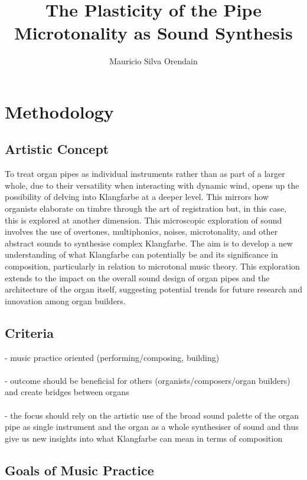 \documentclass[11pt, oneside]{report}   	%
\title{%
 The Plasticity of the Pipe \\
  \large Microtonality as Sound Synthesis \\
    }
\author{Mauricio Silva Orendain}
\begin{document}
\maketitle

\chapter*{Methodology}

\section{Artistic Concept}

To treat organ pipes as individual instruments rather than as part of a larger whole, due to their versatility when interacting with dynamic wind, opens up the possibility of delving into Klangfarbe at a deeper level. This mirrors how organists elaborate on timbre through the art of registration but, in this case, this is explored at another dimension. This microscopic exploration of sound involves the use of overtones, multiphonics, noises, microtonality, and other abstract sounds to synthesise complex Klangfarbe. The aim is to develop a new understanding of what Klangfarbe can potentially be and its significance in composition, particularly in relation to microtonal music theory. This exploration extends to the impact on the overall sound design of organ pipes and the architecture of the organ itself, suggesting potential trends for future research and innovation among organ builders.

\section{Criteria}

- music practice oriented (performing/composing, building)\\
\\
- outcome should be beneficial for others (organists/composers/organ builders) and create bridges between organs\\
\\
- the focus should rely on the artistic use of the broad sound palette of the organ pipe as single instrument and the organ as a whole synthesiser of sound and thus give us new insights into what Klangfarbe can mean in terms of composition \\

\section{Goals of Music Practice}
\end{document}
